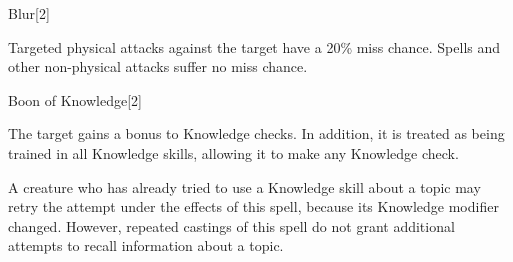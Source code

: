 \begin{spellsection}{Blur}[2]
    \begin{spellheader}
    \end{spellheader}
    \begin{spellcontent}
        \begin{spelltargetinginfo}
        \end{spelltargetinginfo}
        \begin{spelleffects}
            \spelleffect Targeted physical attacks against the target have a 20\% miss chance.
            Spells and other non-physical attacks suffer no miss chance.
            \spelldur \durshort
        \end{spelleffects}
    \end{spellcontent}
    \begin{spellfooter}
        \miscastrandom
    \end{spellfooter}
    \begin{spellaugments}
    \end{spellaugments}
\end{spellsection}

\begin{spellsection}{Boon of Knowledge}[2]
    \begin{spellheader}
    \end{spellheader}
    \begin{spellcontent}
        \begin{spelltargetinginfo}
        \end{spelltargetinginfo}
        \begin{spelleffects}
            \spelleffect The target gains a  bonus to Knowledge checks.
            In addition, it is treated as being trained in all Knowledge skills, allowing it to make any Knowledge check.
            \spelldur \durshort
        \end{spelleffects}
    \end{spellcontent}
    \begin{spellfooter}
        \spellnotes A creature who has already tried to use a Knowledge skill about a topic may retry the attempt under the effects of this spell, because its Knowledge modifier changed.
        However, repeated castings of this spell do not grant additional attempts to recall information about a topic.
        \miscastrandom
    \end{spellfooter}
    \begin{spellaugments}
    \end{spellaugments}
\end{spellsection}

